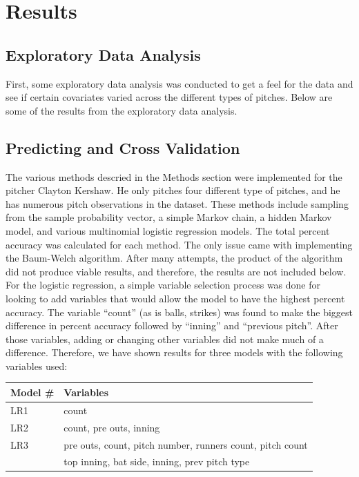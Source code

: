 \documentclass{article}
\begin{document}
\section{Results}

\subsection{Exploratory Data Analysis}

First, some exploratory data analysis was conducted to get a feel for the data and see if certain covariates varied across the different types of pitches. Below are some of the results from the exploratory data analysis.


\subsection{Predicting and Cross Validation}

The various methods descried in the Methods section were implemented for the pitcher Clayton Kershaw. He only pitches four different type of pitches, and he has numerous pitch observations in the dataset. These methods include sampling from the sample probability vector, a simple Markov chain, a hidden Markov model, and various multinomial logistic regression models. The total percent accuracy was calculated for each method. The only issue came with implementing the Baum-Welch algorithm. After many attempts, the product of the algorithm did not produce viable results, and therefore, the results are not included below. For the logistic regression, a simple variable selection process was done for looking to add variables that would allow the model to have the highest percent accuracy. The variable ``count'' (as is balls, strikes) was found to make the biggest difference in percent accuracy followed by ``inning'' and ``previous pitch''. After those variables, adding or changing other variables did not make much of a difference. Therefore, we have shown results for three models with the following variables used:\\ 
\begin{center}
\begin{tabular}{|l|l|}
	\hline
	Model \# & Variables \\ 
	\hline
	LR1  & count \\ 
	\hline
	LR2  & count, pre outs, inning \\
	\hline
	LR3  & pre outs, count, pitch number, runners count, pitch count \\ 
	& top inning, bat side, inning, prev pitch type \\
	\hline
\end{tabular}
\end{center}
\end{document}
